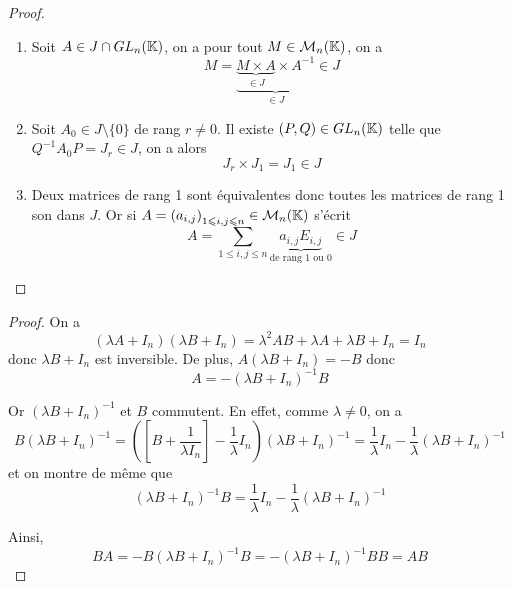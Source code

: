 \begin{proof}
    \phantom{}
    \begin{enumerate}
        \item Soit $A\in J\cap GL_{n}(\mathbb{K})$, on a pour tout $M\in\mathcal{M}_{n}(\mathbb{K})$, on a 
        \begin{equation}
            M=\underbrace{\underbrace{M\times A}_{\in J}\times A^{-1}}_{\in J}\in J
        \end{equation}

        \item Soit $A_{0}\in J\setminus\lbrace0\rbrace$ de rang $r\neq0$. Il existe $(P,Q)\in GL_{n}(\mathbb{K})$ telle que $Q^{-1}A_{0}P=J_{r}\in J$, on a alors 
        \begin{equation}
            \boxed{J_{r}\times J_{1}=J_{1}\in J}
        \end{equation}

        \item Deux matrices de rang 1 sont équivalentes donc toutes les matrices de rang 1 son dans $J$. Or si $A=\left(a_{i,j}\right)_{1\leqslant i,j\leqslant n}\in\mathcal{M}_{n}(\mathbb{K})$ s'écrit 
        \begin{equation}
            \boxed{A=\sum_{1\leqslant i,j\leqslant n}\underbrace{a_{i,j}E_{i,j}}_{\text{de rang 1 ou 0}}\in J}
        \end{equation}
    \end{enumerate}
\end{proof}

\begin{proof}
    On a 
    \begin{equation}
        (\lambda A+I_{n})(\lambda B+I_{n})=\lambda^{2} AB+\lambda A+\lambda B+I_{n}=I_{n}
    \end{equation}
    donc $\lambda B+I_{n}$ est inversible. De plus, $A(\lambda B+I_{n})=-B$ donc 
    \begin{equation}
        A=-\left(\lambda B+I_{n}\right)^{-1}B
    \end{equation}

    Or $(\lambda B+I_{n})^{-1}$ et $B$ commutent. En effet, comme $\lambda\neq0$, on a 
    \begin{equation}
        B(\lambda B+I_{n})^{-1}=\left(\left[B+\frac{1}{\lambda I_{n}}\right]-\frac{1}{\lambda}I_{n}\right)(\lambda B+I_{n})^{-1}=\frac{1}{\lambda}I_{n}-\frac{1}{\lambda}(\lambda B+I_{n})^{-1}
    \end{equation}
    et on montre de même que 
    \begin{equation}
        (\lambda B+I_{n})^{-1}B=\frac{1}{\lambda}I_{n}-\frac{1}{\lambda}(\lambda B+I_{n})^{-1}
    \end{equation}

    Ainsi, 
    \begin{equation}
        \boxed{BA=-B(\lambda B+I_{n})^{-1}B=-(\lambda B+I_{n})^{-1}BB=AB}
    \end{equation}
\end{proof}

